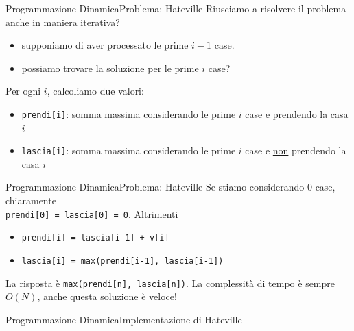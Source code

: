 \documentclass{beamer}
\begin{document}
\begin{frame}{Programmazione Dinamica}{Problema: Hateville}
    Riusciamo a risolvere il problema anche in maniera iterativa?
    \pause
    \begin{itemize}
        \item supponiamo di aver processato le prime $i-1$ case.
        \item possiamo trovare la soluzione per le prime $i$ case?
    \end{itemize}
    \pause
    Per ogni $i$, calcoliamo due valori:
    \begin{itemize}
        \item \texttt{prendi[i]}: somma massima considerando le prime $i$ case e prendendo la casa $i$
        \item \texttt{lascia[i]}: somma massima considerando le prime $i$ case e \underline{non} prendendo la casa $i$
    \end{itemize}
\end{frame}
%
\begin{frame}{Programmazione Dinamica}{Problema: Hateville}
    Se stiamo considerando $0$ case, chiaramente \\ \texttt{prendi[0] = lascia[0] = 0}.
    \vfill
    \pause
    Altrimenti
    \begin{itemize}
        \item \texttt{prendi[i] = lascia[i-1] + v[i]}
        \item \texttt{lascia[i] = max(prendi[i-1], lascia[i-1])}
    \end{itemize}
    \vfill
    \pause
    La risposta \`e \texttt{max(prendi[n], lascia[n])}.
    \vfill
    \pause
    La complessit\`a di tempo \`e sempre $O(N)$, anche questa soluzione \`e veloce!
\end{frame}
%
\begin{frame}{Programmazione Dinamica}{Implementazione di Hateville}
\end{frame}
\end{document}
